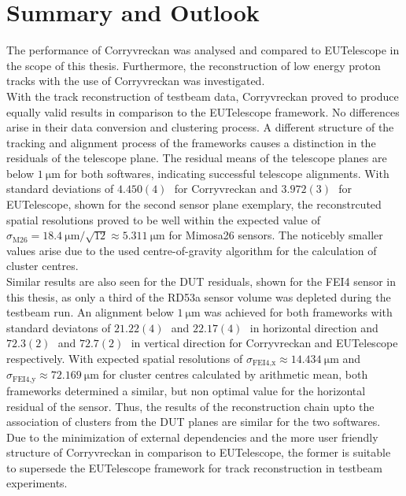 \chapter{Summary and Outlook}
The performance of Corryvreckan was analysed and compared to EUTelescope in the scope of this thesis. Furthermore, the reconstruction of low energy proton
tracks with the use of Corryvreckan was investigated.\\
With the track reconstruction of testbeam data, Corryvreckan proved to produce equally valid results in comparison to the EUTelescope framework. No differences
arise in their data conversion and clustering process. A different structure of the tracking and alignment process of the frameworks causes a distinction in the residuals
of the telescope plane. The residual means of the telescope planes are below $\SI{1}{\micro\meter}$ for both softwares, indicating successful telescope alignments.
With standard deviations of $4.450(4)$\,\textmu\, for Corryvreckan and $3.972(3)$\,\textmu\, for EUTelescope, shown for the second sensor plane exemplary, the
reconstrcuted spatial resolutions proved to be well within
the expected value of $\sigma_{\text{M26}} = \SI{18.4}{\micro\meter}/\sqrt{12} \approx \SI{5.311}{\micro\meter}$ for Mimosa26 sensors. The noticebly smaller values
arise due to the used centre-of-gravity algorithm for the calculation of cluster centres. \\
Similar results are also seen for the DUT residuals, shown for the FEI4 sensor in this thesis, as only a third of the RD53a sensor volume was depleted during the testbeam run.
An alignment below $\SI{1}{\micro\meter}$ was achieved for both frameworks with standard deviatons of $21.22(4)$\,\textmu\, and $22.17(4)$\,\textmu\, in horizontal direction and
$72.3(2)$\,\textmu\, and $72.7(2)$\,\textmu\, in vertical direction for Corryvreckan and EUTelescope respectively. With expected spatial resolutions of
$\sigma_{\text{FEI4},\text{x}} \approx \SI{14.434}{\micro\meter}$ and $\sigma_{\text{FEI4},\text{y}} \approx \SI{72.169}{\micro\meter}$ for cluster centres calculated by
arithmetic mean, both frameworks determined a similar, but non optimal value for the horizontal residual of the sensor.
Thus, the results of the reconstruction chain upto the
association of clusters from the DUT planes are similar for the two softwares. Due to the minimization of external dependencies and the more user friendly structure of
Corryvreckan in comparison to EUTelescope, the former is suitable to supersede the EUTelescope framework for track reconstruction in testbeam experiments. \\
